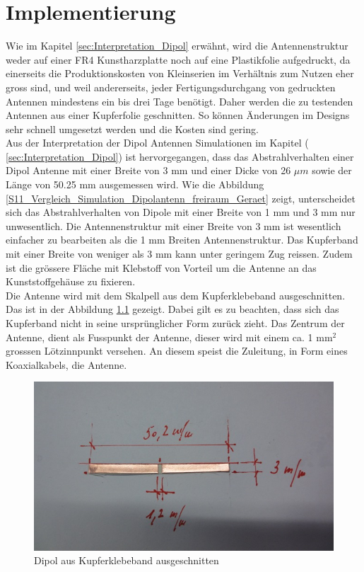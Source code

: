 \newpage 
\thispagestyle{empty}
\chapter{Implementierung}\label{sec:Implementierung}
Wie im Kapitel \ref{sec:Interpretation_Dipol} erwähnt, wird die Antennenstruktur weder auf einer FR4 Kunstharzplatte noch auf eine Plastikfolie aufgedruckt, da einerseits die Produktionskosten von Kleinserien im Verhältnis zum Nutzen eher gross sind, und weil andererseits, jeder Fertigungsdurchgang von gedruckten Antennen mindestens ein bis drei Tage benötigt. Daher werden die zu testenden Antennen aus einer Kupferfolie geschnitten. So können Änderungen im Designs sehr schnell umgesetzt werden und die Kosten sind gering.\\

Aus der Interpretation der Dipol Antennen Simulationen im Kapitel ( \ref{sec:Interpretation_Dipol}) ist hervorgegangen, dass das Abstrahlverhalten einer Dipol Antenne mit einer Breite von 3 mm und einer Dicke von 26 $\mu m$ sowie der Länge von 50.25 mm ausgemessen wird. Wie die Abbildung \ref{S11_Vergleich_Simulation_Dipolantenn_freiraum_Geraet} zeigt, unterscheidet sich das Abstrahlverhalten von Dipole mit einer Breite von 1 mm und 3 mm nur unwesentlich. Die Antennenstruktur mit einer Breite von 3 mm ist wesentlich einfacher zu bearbeiten als die 1 mm Breiten Antennenstruktur. Das Kupferband mit einer Breite von weniger als 3 mm kann unter geringem Zug reissen. Zudem ist die grössere Fläche mit Klebstoff von Vorteil um die Antenne an das Kunststoffgehäuse zu fixieren.  \\
\newpage
Die Antenne wird mit dem Skalpell aus dem Kupferklebeband ausgeschnitten. Das ist in der Abbildung \ref{fig:DipolausKupferband} gezeigt. Dabei gilt es zu beachten, dass sich das Kupferband nicht in seine ursprünglicher Form zurück zieht. Das Zentrum der Antenne, dient als Fusspunkt der Antenne, dieser wird mit einem ca. 1 mm$^{2}$ grosssen Lötzinnpunkt versehen. An diesem speist die Zuleitung, in Form eines Koaxialkabels, die Antenne.\\
\begin{figure}[!ht]
	\centering
	\includegraphics[width=15cm]{content/bilder/Implementierung/Dipol3mm50mm.jpg}%
	\caption{Dipol aus Kupferklebeband ausgeschnitten}
	\label{fig:DipolausKupferband}
\end{figure}

